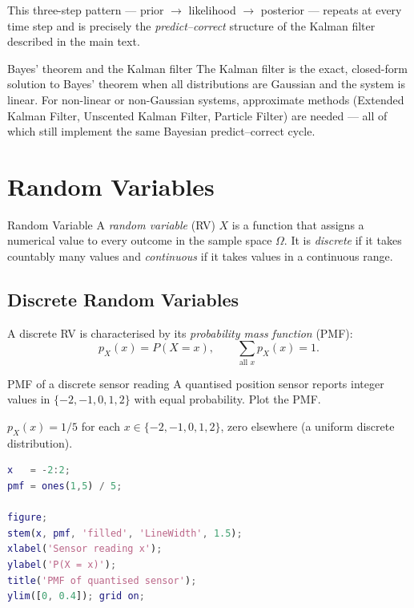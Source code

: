 This three-step pattern — prior $\to$ likelihood $\to$ posterior —
repeats at every time step and is precisely the \emph{predict--correct}
structure of the Kalman filter described in the main text.

\begin{notebox}{Bayes' theorem and the Kalman filter}
  The Kalman filter is the exact, closed-form solution to Bayes'
  theorem when all distributions are Gaussian and the system is
  linear.  For non-linear or non-Gaussian systems, approximate methods
  (Extended Kalman Filter, Unscented Kalman Filter, Particle Filter)
  are needed — all of which still implement the same Bayesian
  predict--correct cycle.
\end{notebox}

\section{Random Variables}
\label{sec:app_rv}

\begin{defnbox}{Random Variable}
A \emph{random variable} (RV) $X$ is a function that assigns a
numerical value to every outcome in the sample space $\Omega$.  It
is \emph{discrete} if it takes countably many values and
\emph{continuous} if it takes values in a continuous range.
\end{defnbox}

\subsection{Discrete Random Variables}
\label{subsec:app_discrete}

A discrete RV is characterised by its
\emph{probability mass function} (PMF):
\[
  p_X(x) = P(X = x), \qquad \sum_{\text{all }x} p_X(x) = 1.
\]

\begin{examplebox}{PMF of a discrete sensor reading}
A quantised position sensor reports integer values in
$\{-2,-1,0,1,2\}$ with equal probability.  Plot the PMF.

\solution
$p_X(x) = 1/5$ for each $x \in \{-2,-1,0,1,2\}$, zero elsewhere
(a uniform discrete distribution).

\begin{lstlisting}[language=Matlab]
x   = -2:2;
pmf = ones(1,5) / 5;

figure;
stem(x, pmf, 'filled', 'LineWidth', 1.5);
xlabel('Sensor reading x');
ylabel('P(X = x)');
title('PMF of quantised sensor');
ylim([0, 0.4]); grid on;
\end{lstlisting}

\end{examplebox}

